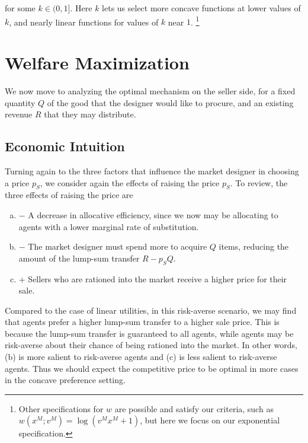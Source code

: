 \documentclass[AER]{AEA}
\begin{document}
for some $k \in (0,1]$. Here $k$ lets us select more concave functions at lower values of $k$, and nearly linear functions for  values of $k$ near $1$. \footnote{Other specifications for $w$ are possible and satisfy our criteria, such as $w(x^M; v^M) = \log(v^M x^M + 1)$, but here we focus on our exponential specification.}

\section{Welfare Maximization}
\label{sec:welfare-maximization}

We now move to analyzing the optimal mechanism on the seller side, for a fixed quantity $Q$ of the good that the designer would like to procure, and an existing revenue $R$ that they may distribute.

\subsection{Economic Intuition}

Turning again to the three factors that influence the market designer in choosing a price $p_S$, we consider again the effects of raising the price $p_S$. To review, the three effects of raising the price are

\begin{enumerate}[(a)]
    \item $-$ A decrease in allocative efficiency, since we now may be allocating to agents with a lower marginal rate of substitution. 
    \item $-$ The market designer must spend more to acquire $Q$ items, reducing the amount of the lump-sum transfer $R - p_SQ$.
    \item $+$ Sellers who are rationed into the market receive a higher price for their sale.
\end{enumerate}

Compared to the case of linear utilities, in this risk-averse scenario, we may find that agents prefer a higher lump-sum transfer to a higher sale price. This is because the lump-sum transfer is guaranteed to all agents, while agents may be risk-averse about their chance of being rationed into the market. In other words, (b) is more salient to risk-averse agents and (c) is less salient to risk-averse agents. Thus we should expect the competitive price to be optimal in more cases in the concave preference setting.

\end{document}
